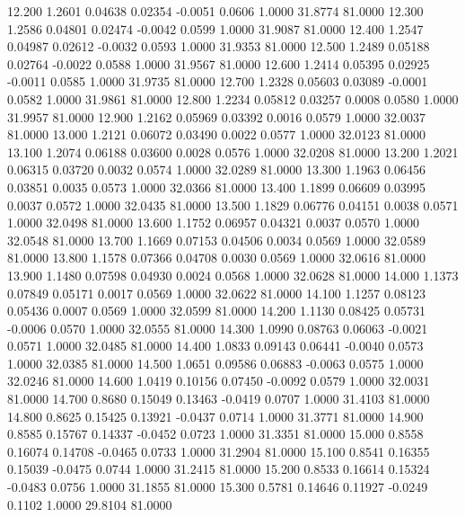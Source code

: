   12.200   1.2601   0.04638   0.02354  -0.0051   0.0606   1.0000  31.8774  81.0000
  12.300   1.2586   0.04801   0.02474  -0.0042   0.0599   1.0000  31.9087  81.0000
  12.400   1.2547   0.04987   0.02612  -0.0032   0.0593   1.0000  31.9353  81.0000
  12.500   1.2489   0.05188   0.02764  -0.0022   0.0588   1.0000  31.9567  81.0000
  12.600   1.2414   0.05395   0.02925  -0.0011   0.0585   1.0000  31.9735  81.0000
  12.700   1.2328   0.05603   0.03089  -0.0001   0.0582   1.0000  31.9861  81.0000
  12.800   1.2234   0.05812   0.03257   0.0008   0.0580   1.0000  31.9957  81.0000
  12.900   1.2162   0.05969   0.03392   0.0016   0.0579   1.0000  32.0037  81.0000
  13.000   1.2121   0.06072   0.03490   0.0022   0.0577   1.0000  32.0123  81.0000
  13.100   1.2074   0.06188   0.03600   0.0028   0.0576   1.0000  32.0208  81.0000
  13.200   1.2021   0.06315   0.03720   0.0032   0.0574   1.0000  32.0289  81.0000
  13.300   1.1963   0.06456   0.03851   0.0035   0.0573   1.0000  32.0366  81.0000
  13.400   1.1899   0.06609   0.03995   0.0037   0.0572   1.0000  32.0435  81.0000
  13.500   1.1829   0.06776   0.04151   0.0038   0.0571   1.0000  32.0498  81.0000
  13.600   1.1752   0.06957   0.04321   0.0037   0.0570   1.0000  32.0548  81.0000
  13.700   1.1669   0.07153   0.04506   0.0034   0.0569   1.0000  32.0589  81.0000
  13.800   1.1578   0.07366   0.04708   0.0030   0.0569   1.0000  32.0616  81.0000
  13.900   1.1480   0.07598   0.04930   0.0024   0.0568   1.0000  32.0628  81.0000
  14.000   1.1373   0.07849   0.05171   0.0017   0.0569   1.0000  32.0622  81.0000
  14.100   1.1257   0.08123   0.05436   0.0007   0.0569   1.0000  32.0599  81.0000
  14.200   1.1130   0.08425   0.05731  -0.0006   0.0570   1.0000  32.0555  81.0000
  14.300   1.0990   0.08763   0.06063  -0.0021   0.0571   1.0000  32.0485  81.0000
  14.400   1.0833   0.09143   0.06441  -0.0040   0.0573   1.0000  32.0385  81.0000
  14.500   1.0651   0.09586   0.06883  -0.0063   0.0575   1.0000  32.0246  81.0000
  14.600   1.0419   0.10156   0.07450  -0.0092   0.0579   1.0000  32.0031  81.0000
  14.700   0.8680   0.15049   0.13463  -0.0419   0.0707   1.0000  31.4103  81.0000
  14.800   0.8625   0.15425   0.13921  -0.0437   0.0714   1.0000  31.3771  81.0000
  14.900   0.8585   0.15767   0.14337  -0.0452   0.0723   1.0000  31.3351  81.0000
  15.000   0.8558   0.16074   0.14708  -0.0465   0.0733   1.0000  31.2904  81.0000
  15.100   0.8541   0.16355   0.15039  -0.0475   0.0744   1.0000  31.2415  81.0000
  15.200   0.8533   0.16614   0.15324  -0.0483   0.0756   1.0000  31.1855  81.0000
  15.300   0.5781   0.14646   0.11927  -0.0249   0.1102   1.0000  29.8104  81.0000
